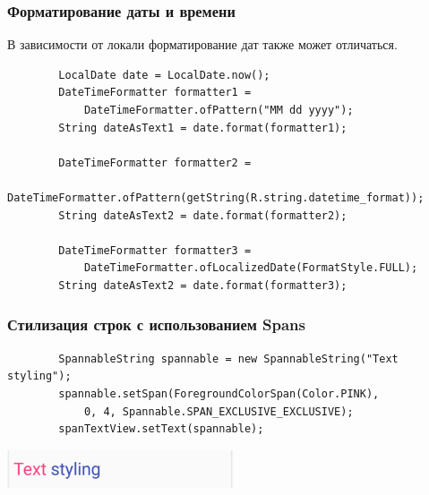 \documentclass{beamer}
\begin{document}
\begin{frame}[fragile]
    \frametitle{Форматирование даты и времени}
    В зависимости от локали форматирование дат также может отличаться.
    \begin{verbatim}
        LocalDate date = LocalDate.now();
        DateTimeFormatter formatter1 =
            DateTimeFormatter.ofPattern("MM dd yyyy");
        String dateAsText1 = date.format(formatter1);

        DateTimeFormatter formatter2 =
            DateTimeFormatter.ofPattern(getString(R.string.datetime_format));
        String dateAsText2 = date.format(formatter2);

        DateTimeFormatter formatter3 =
            DateTimeFormatter.ofLocalizedDate(FormatStyle.FULL);
        String dateAsText2 = date.format(formatter3);
    \end{verbatim}
\end{frame}

\begin{frame}[fragile]
    \frametitle{Стилизация строк с использованием Spans}
    \begin{verbatim}
        SpannableString spannable = new SpannableString("Text styling");
        spannable.setSpan(ForegroundColorSpan(Color.PINK),
            0, 4, Spannable.SPAN_EXCLUSIVE_EXCLUSIVE);
        spanTextView.setText(spannable);
    \end{verbatim}
    \begin{center}
        \includegraphics[width=0.5\textwidth,keepaspectratio]{images/span}
    \end{center}
\end{frame}
\end{document}
